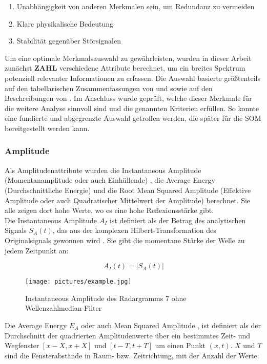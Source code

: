 \begin{enumerate}
    \item Unabhängigkeit von anderen Merkmalen sein, um Redundanz zu vermeiden
    \item Klare physikalische Bedeutung
    \item Stabilität gegenüber Störsignalen
\end{enumerate}
Um eine optimale Merkmalsauswahl zu gewährleisten, wurden in dieser Arbeit zunächst \textbf{ZAHL} verschiedene Attribute berechnet, um ein breites Spektrum potenziell relevanter Informationen zu erfassen. Die Auswahl basierte größtenteils auf den tabellarischen Zusammenfassungen von \textcite{roden_geologic_2015} und \textcite{barnes_too_2006} sowie auf den Beschreibungen von \textcite{chopra_seismic_2007}. Im Anschluss wurde geprüft, welche dieser Merkmale für die weitere Analyse sinnvoll sind und die genannten Kriterien erfüllen. So konnte eine fundierte und abgegrenzte Auswahl getroffen werden, die später für die SOM bereitgestellt werden kann.

\subsubsection{Amplitude}

Als Amplitudenattribute wurden die Instantaneous Amplitude (Momentanamplitude oder auch Einhüllende) \parencite{taner_complex_1979}, die Average Energy (Durchschnittliche Energie) \parencites{roden_geologic_2015}{noauthor_average_2021} und die Root Mean Squared Amplitude (Effektive Amplitude oder auch Quadratischer Mittelwert der Amplitude) \parencites{roden_geologic_2015}{noauthor_rms_2022} berechnet. Sie alle zeigen dort hohe Werte, wo es eine hohe Reflexionsstärke gibt. \\
Die Instantaneous Amplitude $A_I$ \parencite[S. 191]{sheriff_encyclopedic_2002} ist definiert als der Betrag des analytischen Signals $S_A(t)$, das aus der komplexen Hilbert-Transformation des Originalsignals gewonnen wird \parencite[S. 177]{sheriff_encyclopedic_2002}. Sie gibt die momentane Stärke der Welle zu jedem Zeitpunkt an:

\begin{equation}
    A_I(t) = |S_A(t)|
\end{equation}

\begin{figure}[H]
    \centering
    \texttt{[image: pictures/example.jpg]}
    \caption{Instantaneous Amplitude des Radargramms 7 ohne Wellenzahlmedian-Filter}
    \label{fig:inst_amplitude}
\end{figure}
Die Average Energy $E_A$ oder auch Mean Squared Amplitude \parencite{noauthor_average_2021}, ist definiert als der Durchschnitt der quadrierten Amplitudenwerte über ein bestimmtes Zeit- und Wegfenster $\left[x-X, x+X\right]$ und $\left[t-T, t+T\right]$ um einen Punkt $(x,t)$. $X$ und $T$ sind die Fensterabstände in Raum- bzw. Zeitrichtung, mit der Anzahl der Werte:


